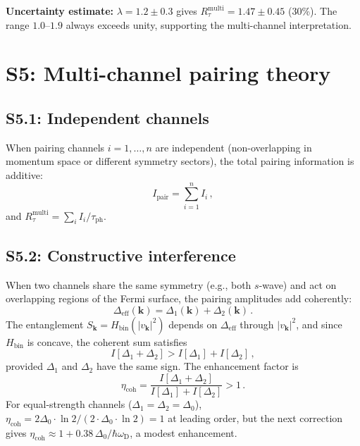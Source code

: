 \documentclass[prb,twocolumn,superscriptaddress,longbibliography,floatfix]{revtex4-2}
\newcommand{\tauasym}{\tau}
\newcommand{\taudec}{\tauasym_{\mathrm{ph}}}
\newcommand{\Ipair}{I_{\mathrm{pair}}}
\newcommand{\Rtau}{R_{\tauasym}}
\newcommand{\oD}{\omega_{\mathrm{D}}}
\begin{document}
\textbf{Uncertainty estimate:}
$\lambda = 1.2 \pm 0.3$ gives
$\Rtau^{\mathrm{multi}} = 1.47 \pm 0.45$ (30\%).
The range $1.0$--$1.9$ always exceeds unity, supporting the
multi-channel interpretation.

\section{S5: Multi-channel pairing theory}
\label{sec:S5}

\subsection{S5.1: Independent channels}

When pairing channels $i = 1, \ldots, n$ are independent
(non-overlapping in momentum space or different symmetry
sectors), the total pairing information is additive:
\begin{equation}\label{eq:S5_additive}
  \Ipair = \sum_{i=1}^{n} I_i\,,
\end{equation}
and $\Rtau^{\mathrm{multi}} = \sum_i I_i/\taudec$.

\subsection{S5.2: Constructive interference}

When two channels share the same symmetry (e.g., both $s$-wave)
and act on overlapping regions of the Fermi surface, the
pairing amplitudes add coherently:
\begin{equation}
  \Delta_{\mathrm{eff}}(\bm{k}) = \Delta_1(\bm{k}) + \Delta_2(\bm{k})\,.
\end{equation}
The entanglement $S_{\bm{k}} = H_{\mathrm{bin}}(|v_{\bm{k}}|^2)$
depends on $\Delta_{\mathrm{eff}}$ through $|v_{\bm{k}}|^2$,
and since $H_{\mathrm{bin}}$ is concave, the coherent sum
satisfies
\begin{equation}\label{eq:S5_coherent}
  I[\Delta_1 + \Delta_2] > I[\Delta_1] + I[\Delta_2]\,,
\end{equation}
provided $\Delta_1$ and $\Delta_2$ have the same sign.  The
enhancement factor is
\begin{equation}
  \eta_{\mathrm{coh}} = \frac{I[\Delta_1 + \Delta_2]}
  {I[\Delta_1] + I[\Delta_2]} > 1\,.
\end{equation}
For equal-strength channels ($\Delta_1 = \Delta_2 = \Delta_0$),
$\eta_{\mathrm{coh}} = 2\Delta_0 \cdot \ln 2 / (2 \cdot \Delta_0 \cdot \ln 2) = 1$
at leading order, but the next correction gives
$\eta_{\mathrm{coh}} \approx 1 + 0.38\, \Delta_0/\hbar\oD$,
a modest enhancement.
\end{document}
